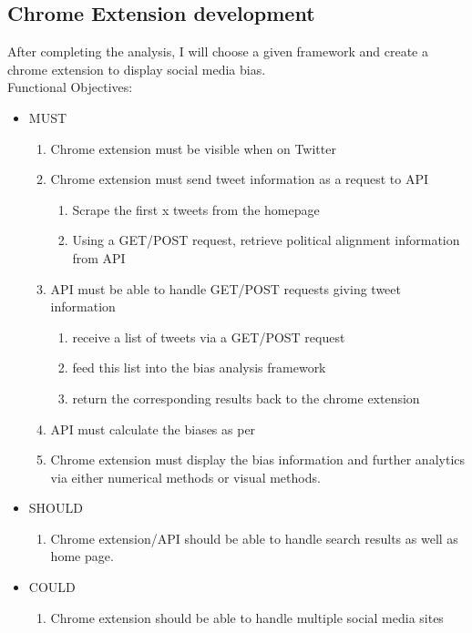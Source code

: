 \documentclass[a4paper,fleqn,10pt]{article}
\begin{document}
\subsection{Chrome Extension development}
After completing the analysis, I will choose a given framework and create a chrome extension to display social media bias.
\\
Functional Objectives:
\begin{itemize}
    \item MUST
    \begin{enumerate}
        \item Chrome extension must be visible when on Twitter
        \item Chrome extension must send tweet information as a request to API 
        \begin{enumerate}
            \item Scrape the first x tweets from the homepage
            \item Using a GET/POST request, retrieve political alignment information from API
        \end{enumerate}
        \item API must be able to handle GET/POST requests giving tweet information
        \begin{enumerate}
            \item receive a list of tweets via a GET/POST request
            \item feed this list into the bias analysis framework
            \item return the corresponding results back to the chrome extension
        \end{enumerate}
        \item API must calculate the biases as per 
        \item Chrome extension must display the bias information and further analytics via either numerical methods or visual methods.
    \end{enumerate}
    \item SHOULD
    \begin{enumerate}
        \item Chrome extension/API should be able to handle search results as well as home page.
    \end{enumerate}
    \item COULD
    \begin{enumerate}
        \item Chrome extension should be able to handle multiple social media sites
    \end{enumerate}
\end{itemize}
\end{document}
